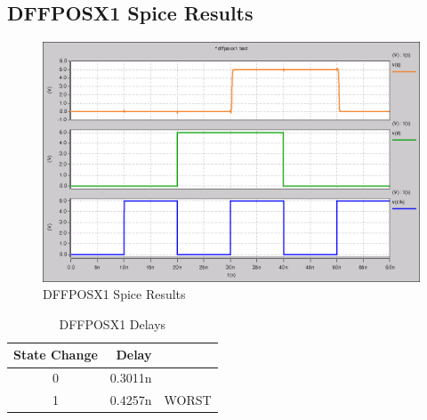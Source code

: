     \subsection{DFFPOSX1 Spice Results}
        
        \begin{figure}[H]
            \centering
            \includegraphics[width=0.75\linewidth]{../../spice/dffposx1.png}
            \caption{DFFPOSX1 Spice Results}
        \end{figure}
        \begin{table}[H]
            \centering
            \begin{tabular}{crc}
                \toprule
                \textbf{State Change} & \textbf{Delay} & \\
                \midrule
                0 & 0.3011n & \\
                1 & 0.4257n & WORST \\
                \bottomrule
            \end{tabular}
            \caption{DFFPOSX1 Delays}
        \end{table}

    \newpage
